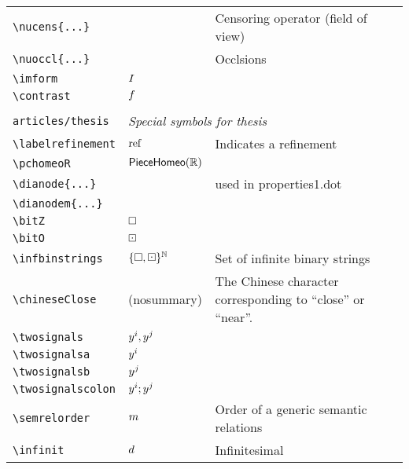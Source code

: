 \begin{longtable}{lll}
 {\color[rgb]{0.5,0.5,0.5}\texttt{\textbackslash nucens\{...\}}} &  &  Censoring operator (field of view)\\ 
 {\color[rgb]{0.5,0.5,0.5}\texttt{\textbackslash nuoccl\{...\}}} &  &  Occlsions\\ 
 {\color[rgb]{0.5,0.5,0.5}\texttt{\textbackslash imform}} & $I$ & \\ 
 {\color[rgb]{0.5,0.5,0.5}\texttt{\textbackslash contrast}} & $f$ & \\ 
  &  & \\ 
 {\color[rgb]{0.5,0.5,0.5}\texttt{articles/thesis}} & \multicolumn{2}{l}{\emph{Special symbols for thesis}}\\ 
 \hline
{\color[rgb]{0.5,0.5,0.5}\texttt{\textbackslash labelrefinement}} & $\text{ref}$ &  Indicates a refinement\\ 
 {\color[rgb]{0.5,0.5,0.5}\texttt{\textbackslash pchomeoR}} & $\mathsf{PieceHomeo}(\mathbb{R})$ & \\ 
 {\color[rgb]{0.5,0.5,0.5}\texttt{\textbackslash dianode\{...\}}} &  &  used in properties1.dot\\ 
 {\color[rgb]{0.5,0.5,0.5}\texttt{\textbackslash dianodem\{...\}}} &  & \\ 
 {\color[rgb]{0.5,0.5,0.5}\texttt{\textbackslash bitZ}} & $\square$ & \\ 
 {\color[rgb]{0.5,0.5,0.5}\texttt{\textbackslash bitO}} & $\boxdot$ & \\ 
 {\color[rgb]{0.5,0.5,0.5}\texttt{\textbackslash infbinstrings}} & ${\{\square,\boxdot\}^\mathbb{N}}$ &  Set of infinite binary strings\\ 
 {\color[rgb]{0.5,0.5,0.5}\texttt{\textbackslash chineseClose}} & (nosummary) &  The Chinese character corresponding to ``close'' or ``near''. \\ 
 {\color[rgb]{0.5,0.5,0.5}\texttt{\textbackslash twosignals}} & $y^i,y^j$ & \\ 
 {\color[rgb]{0.5,0.5,0.5}\texttt{\textbackslash twosignalsa}} & $y^i$ & \\ 
 {\color[rgb]{0.5,0.5,0.5}\texttt{\textbackslash twosignalsb}} & $y^j$ & \\ 
 {\color[rgb]{0.5,0.5,0.5}\texttt{\textbackslash twosignalscolon}} & $y^i;y^j$ & \\ 
 {\color[rgb]{0.5,0.5,0.5}\texttt{\textbackslash semrelorder}} & $m$ &  Order of a generic semantic relations\\ 
 {\color[rgb]{0.5,0.5,0.5}\texttt{\textbackslash infinit}} & $d$ &  Infinitesimal\\ 

\end{longtable}
